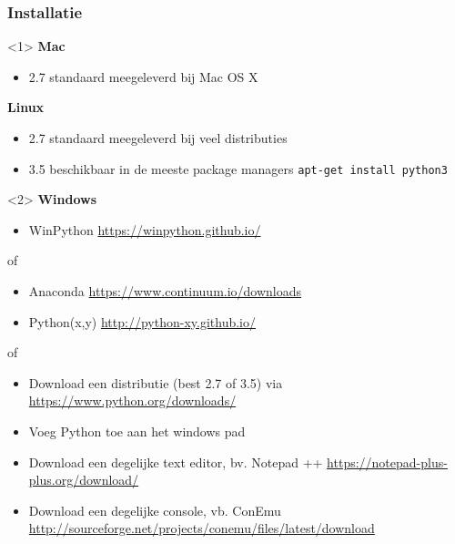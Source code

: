 \documentclass[t]{beamer}
\begin{document}
\begin{frame}
	\frametitle{Installatie}
		
	\begin{onlyenv}
		\textbf{Mac}
		\begin{itemize}
			\item 2.7 standaard meegeleverd bij Mac OS X
		\end{itemize}
		
		\vspace{0.5cm}
		\textbf{Linux}
		\begin{itemize}
			\item 2.7 standaard meegeleverd bij veel distributies
			\item 3.5 beschikbaar in de meeste package managers \lstinline[language=bash]{apt-get install python3}
		\end{itemize}
		
	\end{onlyenv}
	\begin{onlyenv}
		\textbf{Windows}
		\begin{itemize}
			\item WinPython \url{https://winpython.github.io/}
		\end{itemize}
		of
		\begin{itemize}
			\item Anaconda \url{https://www.continuum.io/downloads}
			\item Python(x,y) \url{http://python-xy.github.io/}
		\end{itemize}
		of
		\begin{itemize}
			\item Download een distributie (best 2.7 of 3.5) via \url{https://www.python.org/downloads/}
			\item Voeg Python toe aan het windows pad
			\item Download een degelijke text editor, bv. Notepad ++ \url{https://notepad-plus-plus.org/download/}
			\item Download een degelijke console, vb. ConEmu \url{http://sourceforge.net/projects/conemu/files/latest/download}
		\end{itemize}
	\end{onlyenv}
\end{frame}
\end{document}
